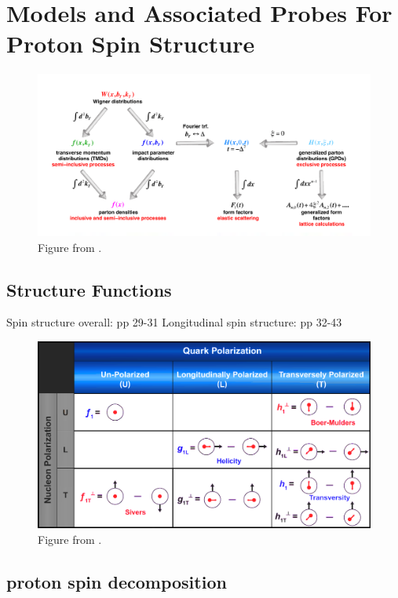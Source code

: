 \chapter{Models and Associated Probes For Proton Spin Structure}
\begin{figure}
  \centering
  \includegraphics[width=\linewidth]{figures/pdf_distributions_invariants.png}
  \caption{
    Figure from \cite{Accardi2012}.
  }
  \label{fig:invariants_observables_pdf}
\end{figure}
\section{ Structure Functions}
Spin structure overall: \cite{Accardi2012} pp 29-31
Longitudinal spin structure: \cite{Accardi2012} pp 32-43

\begin{figure}
  \centering
  \includegraphics[width=\linewidth]{figures/leading_twist_polarization_config.png}
  \caption{
    Figure from \cite{Accardi2012}.
  }
  \label{fig:invariants_observables_pdf}
\end{figure}

\section{ proton spin decomposition}
